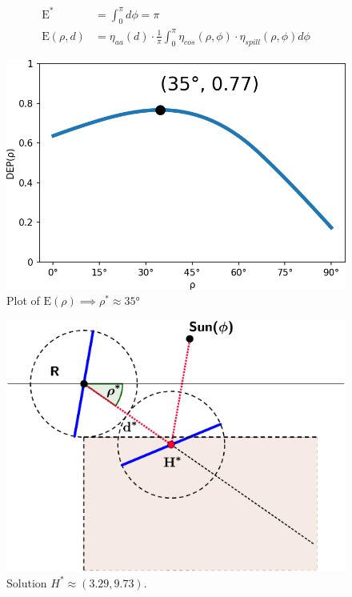 \documentclass[10pt, xcolor={dvipsnames}]{beamer}
\begin{document}
\begin{frame}
\begin{definition}
\begin{align}
\text{E}^{*} &= \int_{0}^{\pi} d\phi = \pi \\[.5em]
\text{E}(\rho, d) &= \eta_{aa}(d) \cdot 
\frac{1}{\pi}\int_{0}^{\pi} 
\eta_{cos}(\rho, \phi) \cdot \eta_{spill}(\rho, \phi)
d\phi
\end{align}
\end{definition}
\begin{minipage}[t]{0.5\textwidth}
\begin{center}
\vspace{1.2cm}
\begin{figure}
\includegraphics[width=.8\textwidth]{../figures/DEP-crop.png}
\caption{Plot of $\text{E}(\rho) \implies \rho^{*} \approx 35$°}
\end{figure}
\end{center}
\end{minipage}%
\begin{minipage}[t]{0.5\textwidth}
\begin{center}
\begin{figure}
\includegraphics[width=\textwidth]{../figures/singleton-solution-crop.pdf}
\caption{Solution $H^{*} \approx (3.29, 9.73)$.}
\end{figure}
\end{center}
\end{minipage}
\end{frame}
\end{document}
